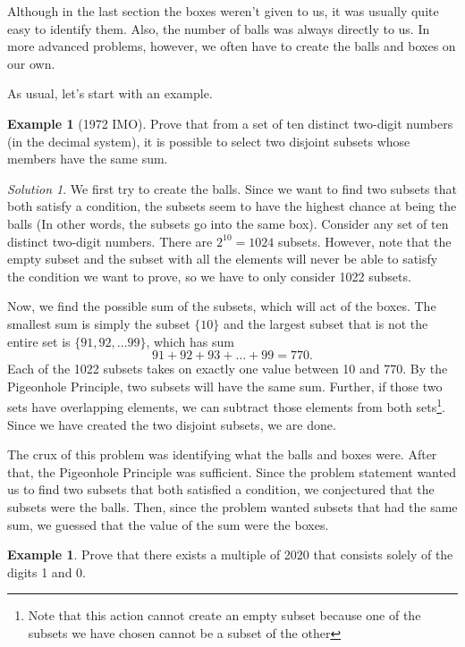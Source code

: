 \documentclass[l1pt]{article}
\theoremstyle{plain}
\theoremstyle{definition}
\newtheorem{example}[thm]{Example}
\theoremstyle{remark}
\newtheorem*{solution}{Solution}
\begin{document}
Although in the last section the boxes weren't given to us, it was usually quite easy to identify them. Also, the number of balls was always directly to us. In more advanced problems, however, we often have to create the balls and boxes on our own. 

As usual, let's start with an example.

\begin{example}[1972 IMO]
Prove that from a set of ten distinct two-digit numbers (in the decimal system), it is possible to select two disjoint subsets whose members have the same sum.
\end{example}

\begin{solution}
We first try to create the balls. Since we want to find two subsets that both satisfy a condition, the subsets seem to have the highest chance at being the balls (In other words, the subsets go into the same box). Consider any set of ten distinct two-digit numbers. There are $2^{10}=1024$ subsets. However, note that the empty subset and the subset with all the elements will never be able to satisfy the condition we want to prove, so we have to only consider 1022 subsets.

Now, we find the possible sum of the subsets, which will act of the boxes. The smallest sum is simply the subset $\{10\}$ and the largest subset that is not the entire set is $\{91, 92, \dots 99\}$, which has sum \[91+92+93+\dots+99=770.\] Each of the 1022 subsets takes on exactly one value between 10 and 770. By the Pigeonhole Principle, two subsets will have the same sum. Further, if those two sets have overlapping elements, we can subtract those elements from both sets\footnote{Note that this action cannot create an empty subset because one of the subsets we have chosen cannot be a subset of the other}. Since we have created the two disjoint subsets, we are done. 
\end{solution}

The crux of this problem was identifying what the balls and boxes were. After that, the Pigeonhole Principle was sufficient. Since the problem statement wanted us to find two subsets that both satisfied a condition, we conjectured that the subsets were the balls. Then, since the problem wanted subsets that had the same sum, we guessed that the value of the sum were the boxes.

\begin{example}
\label{example:2020 mod thing}
Prove that there exists a multiple of 2020 that consists solely of the digits 1 and 0.
\end{example}
\end{document}

